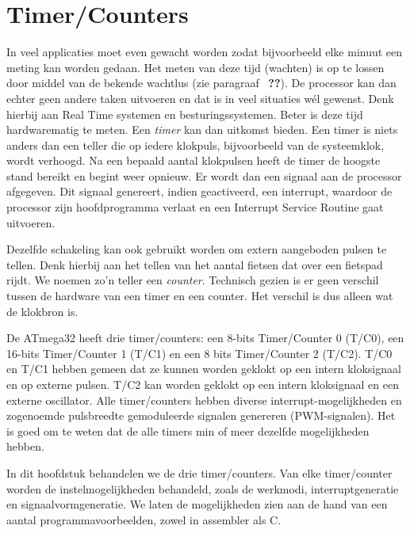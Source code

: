 \chapter{Timer/Counters}
\label{cha:timercounters}
In veel applicaties moet even gewacht worden zodat bijvoorbeeld elke minuut een
meting kan worden gedaan.
 Het meten van deze
tijd (wachten) is op te lossen door middel van de bekende wachtlus (zie paragraaf~%
\textbf{??}). De processor kan dan echter geen andere taken
uitvoeren en dat is in veel situaties wél gewenst. Denk hierbij aan Real Time
systemen en besturingssystemen. Beter is deze tijd hardwarematig te meten.
Een \textsl{timer} kan dan uitkomst bieden. Een timer is niets anders dan een teller
die op iedere klokpuls, bijvoorbeeld van de systeemklok, wordt verhoogd. Na een bepaald
aantal klokpulsen heeft de timer de hoogste stand bereikt en begint weer opnieuw.
Er wordt dan een signaal aan de processor afgegeven. Dit signaal genereert, indien geactiveerd, een interrupt, waardoor de processor zijn hoofdprogramma verlaat en een
Interrupt Service Routine gaat uitvoeren.

Dezelfde schakeling kan ook gebruikt worden om extern aangeboden pulsen te tellen.
Denk hierbij aan het tellen van het aantal fietsen dat over een fietspad rijdt.
We noemen zo'n teller een \textsl{counter}. Technisch gezien is er geen verschil
tussen de hardware van een timer en een counter. Het verschil is dus alleen wat
de klokbron is.

De ATmega32 heeft drie timer/counters: een 8-bits Timer/Counter 0 (T/C0), een
16-bits Timer/Counter 1 (T/C1) en een 8 bits Timer/Counter 2 (T/C2).
T/C0 en T/C1 hebben gemeen dat
ze kunnen worden geklokt op een intern kloksignaal en op externe pulsen.
T/C2 kan worden geklokt op een intern kloksignaal en een externe oscillator.
Alle timer/counters hebben diverse interrupt-mogelijkheden en zogenoemde
pulsbreedte gemoduleerde signalen genereren (PWM-signalen). Het is goed om
te weten dat de alle timers min of meer dezelfde mogelijkheden hebben.

In dit hoofdstuk behandelen we de drie timer/counters. Van elke timer/counter
worden de instelmogelijkheden behandeld, zoals de werkmodi, interruptgeneratie
en signaalvormgeneratie. We laten de mogelijkheden zien aan de hand van een aantal
programmavoorbeelden, zowel in assembler als C.


